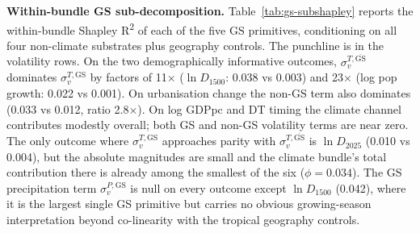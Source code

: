 \documentclass[11pt,letterpaper]{article}
\begin{document}
\textbf{Within-bundle GS sub-decomposition.} Table~\ref{tab:gs-subshapley} reports the within-bundle Shapley R\textsuperscript{2} of each of the five GS primitives, conditioning on all four non-climate substrates plus geography controls. The punchline is in the volatility rows. On the two demographically informative outcomes, $\sigma_v^{T,\overline{\mathrm{GS}}}$ dominates $\sigma_v^{T,\mathrm{GS}}$ by factors of 11$\times$ ($\ln D_{1500}$: 0.038 vs 0.003) and 23$\times$ (log pop growth: 0.022 vs 0.001). On urbanisation change the non-GS term also dominates (0.033 vs 0.012, ratio 2.8$\times$). On log GDPpc and DT timing the climate channel contributes modestly overall; both GS and non-GS volatility terms are near zero. The only outcome where $\sigma_v^{T,\mathrm{GS}}$ approaches parity with $\sigma_v^{T,\overline{\mathrm{GS}}}$ is $\ln D_{2025}$ (0.010 vs 0.004), but the absolute magnitudes are small and the climate bundle's total contribution there is already among the smallest of the six ($\phi = 0.034$). The GS precipitation term $\sigma_v^{P,\mathrm{GS}}$ is null on every outcome except $\ln D_{1500}$ (0.042), where it is the largest single GS primitive but carries no obvious growing-season interpretation beyond co-linearity with the tropical geography controls.

\begin{table}[H]
\centering
\small
\caption{Within-bundle growing-season Shapley R\textsuperscript{2} decomposition. Each entry is the Shapley share of the labeled primitive within the five-element GS climate bundle, conditioning on geography controls plus all four non-climate substrates (functional alleles, Neolithic fraction, ancestral crop yield, pandemic intensity). Sample: 116 countries with well-defined non-growing-season months ($n_{\mathrm{GS}} < 12$). Row sums approximate the five-element bundle's coalition Shapley R\textsuperscript{2} from the principal exercise on this sample.}
\label{tab:gs-subshapley}

\end{table}
\end{document}
